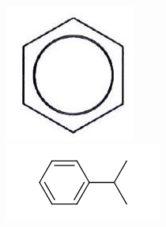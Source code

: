 \documentclass[10pt]{article}
\begin{document}
\begin{itemize}
\includegraphics[max width=\textwidth, center]{2025_10_23_adad5b98d65ac6665838g-43(1)}\\
\includegraphics{smile-21bc7fea236bd4e0d31de9fa1233b2d693c7306c}
\end{itemize}
\end{document}

